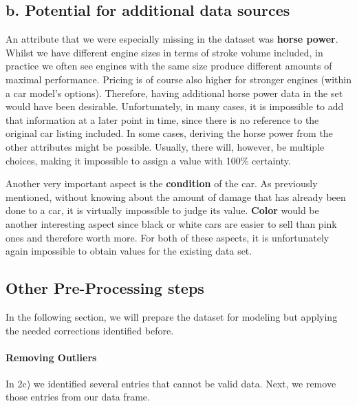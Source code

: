 \documentclass[sigchi]{acmart}
\begin{document}
\hypertarget{b.-potential-for-additional-data-sources}{%
\subsection{b. Potential for additional data sources}\label{b.-potential-for-additional-data-sources}}

An attribute that we were especially missing in the dataset was \textbf{horse power}. Whilst we have different engine sizes in terms of stroke volume included, in practice we often see engines with the same size produce different amounts of maximal performance. Pricing is of course also higher for stronger engines (within a car model's options). Therefore, having additional horse power data in the set would have been desirable. Unfortunately, in many cases, it is impossible to add that information at a later point in time, since there is no reference to the original car listing included. In some cases, deriving the horse power from the other attributes might be possible. Usually, there will, however, be multiple choices, making it impossible to assign a value with 100\% certainty.

Another very important aspect is the \textbf{condition} of the car. As previously mentioned, without knowing about the amount of damage that has already been done to a car, it is virtually impossible to judge its value. \textbf{Color} would be another interesting aspect since black or white cars are easier to sell than pink ones and therefore worth more. For both of these aspects, it is unfortunately again impossible to obtain values for the existing data set.

\hypertarget{other-pre-processing-steps}{%
\subsection{Other Pre-Processing steps}\label{other-pre-processing-steps}}

In the following section, we will prepare the dataset for modeling but applying the needed corrections identified before.

\hypertarget{removing-outliers}{%
\paragraph{Removing Outliers}\label{removing-outliers}}

In 2c) we identified several entries that cannot be valid data. Next, we remove those entries from our data frame.
\end{document}
